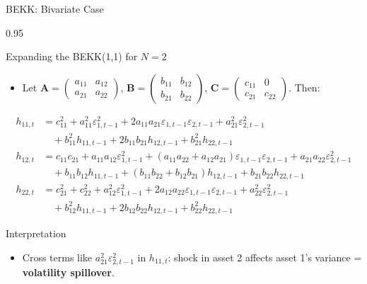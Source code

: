 \documentclass[9pt, aspectratio=169, t]{beamer}
\begin{document}
\begin{frame}{BEKK: Bivariate Case}
    \begin{cminipage}{0.95\textwidth}
    {\scriptsize
    \begin{block}{Expanding the BEKK(1,1) for $N=2$}
        \begin{itemize}\setlength{\itemsep}{0pt}
            \item Let $\mathbf{A} = \begin{pmatrix} a_{11} & a_{12} \\ a_{21} & a_{22} \end{pmatrix}$, $\mathbf{B} = \begin{pmatrix} b_{11} & b_{12} \\ b_{21} & b_{22} \end{pmatrix}$, $\mathbf{C} = \begin{pmatrix} c_{11} & 0 \\ c_{21} & c_{22} \end{pmatrix}$. Then:
        \end{itemize}
        \begin{align}
            h_{11,t} &= c_{11}^2 + a_{11}^2\varepsilon_{1,t-1}^2 + 2a_{11}a_{21}\varepsilon_{1,t-1}\varepsilon_{2,t-1} + a_{21}^2\varepsilon_{2,t-1}^2 \\
            &\quad + b_{11}^2 h_{11,t-1} + 2b_{11}b_{21}h_{12,t-1} + b_{21}^2 h_{22,t-1} \nonumber \\[3pt]
            h_{12,t} &= c_{11}c_{21} + a_{11}a_{12}\varepsilon_{1,t-1}^2 + (a_{11}a_{22}+a_{12}a_{21})\varepsilon_{1,t-1}\varepsilon_{2,t-1} + a_{21}a_{22}\varepsilon_{2,t-1}^2 \\
            &\quad + b_{11}b_{12}h_{11,t-1} + (b_{11}b_{22}+b_{12}b_{21})h_{12,t-1} + b_{21}b_{22}h_{22,t-1} \nonumber \\[3pt]
            h_{22,t} &= c_{21}^2 + c_{22}^2 + a_{12}^2\varepsilon_{1,t-1}^2 + 2a_{12}a_{22}\varepsilon_{1,t-1}\varepsilon_{2,t-1} + a_{22}^2\varepsilon_{2,t-1}^2 \\
            &\quad + b_{12}^2 h_{11,t-1} + 2b_{12}b_{22}h_{12,t-1} + b_{22}^2 h_{22,t-1} \nonumber
        \end{align}
    \end{block}
    \begin{alertblock}{Interpretation}
        \begin{itemize}\setlength{\itemsep}{0pt}
            \item Cross terms like $a_{21}^2\varepsilon_{2,t-1}^2$ in $h_{11,t}$: shock in asset 2 affects asset 1's variance = \textbf{volatility spillover}.
        \end{itemize}
    \end{alertblock}
    }
    \end{cminipage}
\end{frame}
\end{document}

